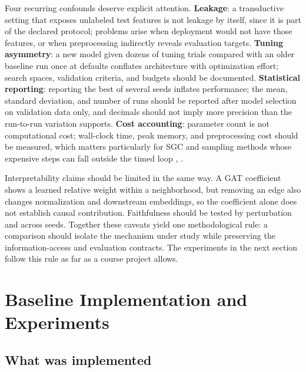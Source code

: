 \documentclass[conference]{IEEEtran}
\begin{document}
Four recurring confounds deserve explicit attention. \textbf{Leakage}: a transductive setting that exposes unlabeled test features is not leakage by itself, since it is part of the declared protocol; problems arise when deployment would not have those features, or when preprocessing indirectly reveals evaluation targets. \textbf{Tuning asymmetry}: a new model given dozens of tuning trials compared with an older baseline run once at defaults conflates architecture with optimization effort; search spaces, validation criteria, and budgets should be documented. \textbf{Statistical reporting}: reporting the best of several seeds inflates performance; the mean, standard deviation, and number of runs should be reported after model selection on validation data only, and decimals should not imply more precision than the run-to-run variation supports. \textbf{Cost accounting}: parameter count is not computational cost; wall-clock time, peak memory, and preprocessing cost should be measured, which matters particularly for SGC and sampling methods whose expensive steps can fall outside the timed loop \cite{b5}, \cite{b8}.

Interpretability claims should be limited in the same way. A GAT coefficient shows a learned relative weight within a neighborhood, but removing an edge also changes normalization and downstream embeddings, so the coefficient alone does not establish causal contribution. Faithfulness should be tested by perturbation and across seeds. Together these caveats yield one methodological rule: a comparison should isolate the mechanism under study while preserving the information-access and evaluation contracts. The experiments in the next section follow this rule as far as a course project allows.

\section{Baseline Implementation and Experiments}

\subsection{What was implemented}
\end{document}
